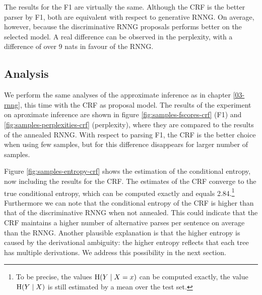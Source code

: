     

    

    The results for the F1 are virtually the same. Although the CRF is the better parser by F1, both are equivalent with respect to generative RNNG. On average, however, because the discriminative RNNG proposals performs better on the selected model. A real difference can be observed in the perplexity, with a difference of over 9 nats in favour of the RNNG.

  \subsection{Analysis}

    We perform the same analyses of the approximate inference as in chapter \ref{03-rnng}, this time with the CRF as proposal model. The results of the experiment on aproximate inference are shown in figure \ref{fig:samples-fscores-crf} (F1) and \ref{fig:samples-perplexities-crf} (perplexity), where they are compared to the results of the annealed RNNG. With respect to parsing F1, the CRF is the better choice when using few samples, but for this difference disappears for larger number of samples.

    Figure \ref{fig:samples-entropy-crf} shows the estimation of the conditional entropy, now including the results for the CRF. The estimates of the CRF converge to the true conditional entropy, which can be computed exactly and equals 2.84.\footnote{To be precise, the values $\operatorname{H}(Y \mid X = x)$ can be computed exactly, the value $\operatorname{H}(Y \mid X)$ is still estimated by a mean over the test set.} Furthermore we can note that the conditional entropy of the CRF is higher than that of the discriminative RNNG when not annealed. This could indicate that the CRF maintains a higher number of alternative parses per sentence on average than the RNNG. Another plausible explanation is that the higher entropy is caused by the derivational ambiguity: the higher entropy reflects that each tree has multiple derivations. We address this possibility in the next section.

